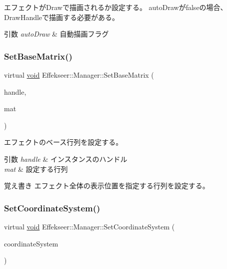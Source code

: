エフェクトが\+Drawで描画されるか設定する。 auto\+Drawがfalseの場合、\+Draw\+Handleで描画する必要がある。 


\begin{DoxyParams}{引数}
{\em auto\+Draw} & 自動描画フラグ \\
\hline
\end{DoxyParams}
\mbox{\label{class_effekseer_1_1_manager_a0f94ad0b6cd362283bc216515a89822c}} 
\subsubsection{\texorpdfstring{Set\+Base\+Matrix()}{SetBaseMatrix()}}
{\footnotesize\ttfamily virtual \mbox{\hyperlink{namespace_effekseer_ab34c4088e512200cf4c2716f168deb56}{void}} Effekseer\+::\+Manager\+::\+Set\+Base\+Matrix (\begin{DoxyParamCaption}\item[{\mbox{\hyperlink{namespace_effekseer_afba58b8d812da862190e9bbfc040824a}{Handle}}}]{handle,  }\item[{const \mbox{\hyperlink{struct_effekseer_1_1_matrix43}{Matrix43}} \&}]{mat }\end{DoxyParamCaption})\hspace{0.3cm}{\ttfamily [pure virtual]}}



エフェクトのベース行列を設定する。 


\begin{DoxyParams}{引数}
{\em handle} & インスタンスのハンドル \\
\hline
{\em mat} & 設定する行列 \\
\hline
\end{DoxyParams}
\begin{DoxyNote}{覚え書き}
エフェクト全体の表示位置を指定する行列を設定する。 
\end{DoxyNote}
\mbox{\label{class_effekseer_1_1_manager_a804730036eada2d3e1883ed366c265cc}} 
\subsubsection{\texorpdfstring{Set\+Coordinate\+System()}{SetCoordinateSystem()}}
{\footnotesize\ttfamily virtual \mbox{\hyperlink{namespace_effekseer_ab34c4088e512200cf4c2716f168deb56}{void}} Effekseer\+::\+Manager\+::\+Set\+Coordinate\+System (\begin{DoxyParamCaption}\item[{\mbox{\hyperlink{namespace_effekseer_ac8508f8823c5fcf36aac5d2ddee23765}{Coordinate\+System}}}]{coordinate\+System }\end{DoxyParamCaption})\hspace{0.3cm}{\ttfamily [pure virtual]}}



